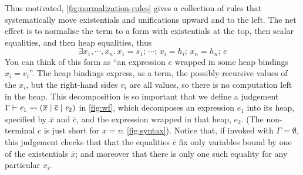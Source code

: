 \documentclass[acmsmall,review,anonymous,dvipsnames]{acmart}
\newcommand{\Varid}[1]{\mathit{#1}}
\begin{document}
%

Thus motivated, \cref{fig:normalization-rules} gives a collection of rules that systematically move
existentials and unifications upward and to the left.  The net effect is to normalise
the term to a form with existentials at the top, then scalar equalities, and then
heap equalities, thus
$$
\ensuremath{\exists\Varid{x}_{\mathrm{1}},\cdots,\Varid{x}_{\Varid{n}}.\,\Varid{x}_{\mathrm{1}}=\Varid{s}_{\mathrm{1}};\,\cdots;\,\Varid{x}_{\Varid{i}}\mathrel{=}\Varid{h}_{\Varid{i}};\,\Varid{x}_{\Varid{n}}=\Varid{h}_{\Varid{n}};\,\Varid{e}}
$$
You can think of this form as ``an expression \ensuremath{\Varid{e}} wrapped in some heap bindings \ensuremath{\Varid{x}_{\Varid{i}}=\Varid{v}_{\Varid{i}}}''. The
heap bindings express, as a term, the possibly-recursive values of the \ensuremath{\Varid{x}_{\Varid{i}}}, but the right-hand
sides \ensuremath{\Varid{v}_{\Varid{i}}} are all values, so there is no computation left in the heap.  This decomposition is
so important that we define a judgement $\wff{\Gamma}{\ensuremath{\Varid{e}_{\mathrm{1}}}}{\ensuremath{\overline{x}}}{\ensuremath{\overline{c}}}{\ensuremath{\Varid{e}_{\mathrm{2}}}}$ in \cref{fig:wf},
which decomposes an expression $\ensuremath{\Varid{e}_{\mathrm{1}}}$ into its heap, specified by \ensuremath{\overline{x}} and \ensuremath{\overline{c}}, and the expression
wrapped in that heap, \ensuremath{\Varid{e}_{\mathrm{2}}}.  (The non-terminal \ensuremath{\Varid{c}} is just short for \ensuremath{\Varid{x}=\Varid{v}}; \cref{fig:syntax}).
Notice that, if invoked with $\Gamma = \emptyset$, this judgement checks that that the equalities
\ensuremath{\overline{c}} fix only variables bound by one of the existentials \ensuremath{\overline{x}}; and moreover that there is only
one such equality for any particular \ensuremath{\Varid{x}_{\Varid{i}}}.
\end{document}
